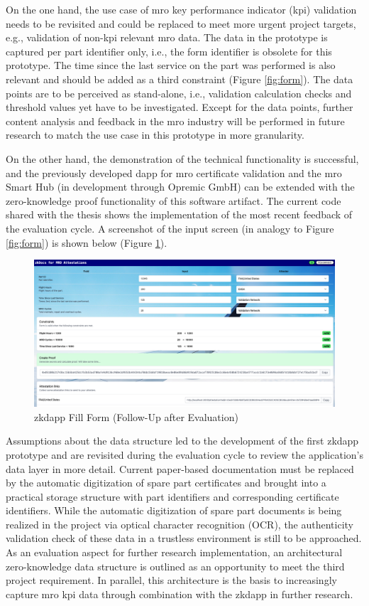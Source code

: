 On the one hand, the use case of \acrshort{mro} key performance indicator (\acrshort{kpi}) validation needs to be revisited and could be replaced to meet more urgent project targets, e.g., validation of non-\acrshort{kpi} relevant \acrshort{mro} data. The data in the prototype is captured per part identifier only, i.e., the form identifier is obsolete for this prototype. The time since the last service on the part was performed is also relevant and should be added as a third constraint (Figure \ref{fig:form}). The data points are to be perceived as stand-alone, i.e., validation calculation checks and threshold values yet have to be investigated. Except for the data points, further content analysis and feedback in the \acrshort{mro} industry will be performed in future research to match the use case in this prototype in more granularity.

On the other hand, the demonstration of the technical functionality is successful, and the previously developed \acrshort{dapp} for \acrshort{mro} certificate validation and the \acrshort{mro} Smart Hub (in development through Opremic GmbH) can be extended with the zero-knowledge proof functionality of this software artifact. The current code shared with the thesis shows the implementation of the most recent feedback of the evaluation cycle. A screenshot of the input screen (in analogy to Figure \ref{fig:form}) is shown below (Figure \ref{fig:form1}).
\begin{figure}[hbt]
	\centering
		\includegraphics[width=1.0\textwidth]{Pictures/form1.png}
	\caption{\acrshort{zkdapp} Fill Form (Follow-Up after Evaluation)}
	\label{fig:form1}
\end{figure}
Assumptions about the data structure led to the development of the first \acrshort{zkdapp} prototype and are revisited during the evaluation cycle to review the application's data layer in more detail. Current paper-based documentation must be replaced by the automatic digitization of spare part certificates and brought into a practical storage structure with part identifiers and corresponding certificate identifiers. While the automatic digitization of spare part documents is being realized in the project via optical character recognition (OCR), the authenticity validation check of these data in a trustless environment is still to be approached. As an evaluation aspect for further research implementation, an architectural zero-knowledge data structure is outlined as an opportunity to meet the third project requirement. In parallel, this architecture is the basis to increasingly capture \acrshort{mro} \acrshort{kpi} data through combination with the \acrshort{zkdapp} in further research. 

